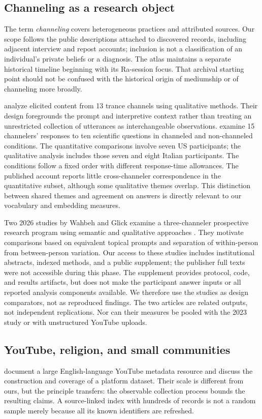 \subsection{Channeling as a research object}
The term \emph{channeling} covers heterogeneous practices and attributed sources. Our scope follows the public descriptions attached to discovered records, including adjacent interview and repost accounts; inclusion is not a classification of an individual's private beliefs or a diagnosis. The atlas maintains a separate historical timeline beginning with its Ra-session focus. That archival starting point should not be confused with the historical origin of mediumship or of channeling more broadly.

\citet{anastasia2020qualitative} analyze elicited content from 13 trance channels using qualitative methods. Their design foregrounds the prompt and interpretive context rather than treating an unrestricted collection of utterances as interchangeable observations. \citet{wahbeh2023answers} examine 15 channelers' responses to ten scientific questions in channeled and non-channeled conditions. The quantitative comparisons involve seven US participants; the qualitative analysis includes those seven and eight Italian participants. The conditions follow a fixed order with different response-time allowances. The published account reports little cross-channeler correspondence in the quantitative subset, although some qualitative themes overlap. This distinction between shared themes and agreement on answers is directly relevant to our vocabulary and embedding measures.

Two 2026 studies by Wahbeh and Glick examine a three-channeler prospective research program using semantic and qualitative approaches \citep{wahbeh2026semantic,wahbeh2026qualitative}. They motivate comparisons based on equivalent topical prompts and separation of within-person from between-person variation. Our access to these studies includes institutional abstracts, indexed methods, and a public supplement; the publisher full texts were not accessible during this phase. The supplement provides protocol, code, and results artifacts, but does not make the participant answer inputs or all reported analysis components available. We therefore use the studies as design comparators, not as reproduced findings. The two articles are related outputs, not independent replications. Nor can their measures be pooled with the 2023 study or with unstructured YouTube uploads.

\subsection{YouTube, religion, and small communities}
\citet{ribeiro2021youniverse} document a large English-language YouTube metadata resource and discuss the construction and coverage of a platform dataset. Their scale is different from ours, but the principle transfers: the observable collection process bounds the resulting claims. A source-linked index with hundreds of records is not a random sample merely because all its known identifiers are refreshed.

